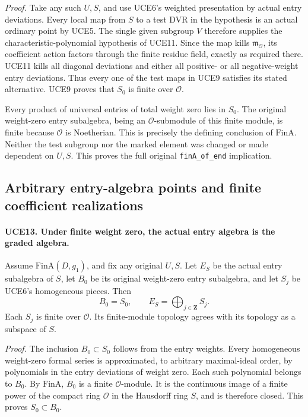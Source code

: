 \documentclass[11pt,a4paper]{article}
\numberwithin{equation}{section}
\theoremstyle{remark}\newtheorem{remark}[theorem]{Remark}
\begin{document}
\emph{Proof.}
Take any such \(U,S\), and use UCE6's weighted presentation by
actual entry deviations.  Every local map from \(S\) to a test
DVR in the hypothesis is an actual ordinary point by UCE5.
The single given subgroup \(V\) therefore supplies the
characteristic-polynomial hypothesis of UCE11.  Since the map
kills \(\mathfrak m_{\mathcal O}\), its coefficient action
factors through the finite residue field, exactly as required there.
UCE11 kills all diagonal deviations and either all positive- or
all negative-weight entry deviations.  Thus every one of the
test maps in UCE9 satisfies its stated alternative.  UCE9 proves
that \(S_0\) is finite over \(\mathcal O\).

Every product of universal entries of total weight zero lies in
\(S_0\).  The original weight-zero entry subalgebra, being an
\(\mathcal O\)-submodule of this finite module, is finite because
\(\mathcal O\) is Noetherian.  This is precisely the defining
conclusion of \(\mathrm{FinA}\).  Neither the test subgroup nor
the marked element was changed or made dependent on \(U,S\).
This proves the full original \texttt{fin\allowbreak A\_\allowbreak of\_\allowbreak end} implication.

\subsection{Arbitrary entry-algebra points and finite coefficient realizations}

\paragraph{UCE13. Under finite weight zero, the actual entry algebra is the graded algebra.}
\label{claim:UCE13}
Assume \(\mathrm{FinA}(D,g_1)\), and fix any original \(U,S\).
Let \(E_S\) be the actual entry subalgebra of \(S\), let
\(B_0\) be its original weight-zero entry subalgebra, and let
\(S_j\) be UCE6's homogeneous pieces.  Then
\[
                 B_0=S_0,\qquad E_S=\bigoplus_{j\in\mathbf Z}S_j.
 \tag{UCE.9}
\]
Each \(S_j\) is finite over \(\mathcal O\).  Its finite-module
topology agrees with its topology as a subspace of \(S\).

\emph{Proof.}
The inclusion \(B_0\subset S_0\) follows from the entry weights.
Every homogeneous weight-zero formal series is approximated, to
arbitrary maximal-ideal order, by polynomials in the entry deviations
of weight zero.  Each such polynomial belongs to \(B_0\).
By \(\mathrm{FinA}\), \(B_0\) is a finite \(\mathcal O\)-module.
It is the continuous image of a finite power of the compact ring
\(\mathcal O\) in the Hausdorff ring \(S\), and is therefore
closed.  This proves \(S_0\subset B_0\).
\end{document}
